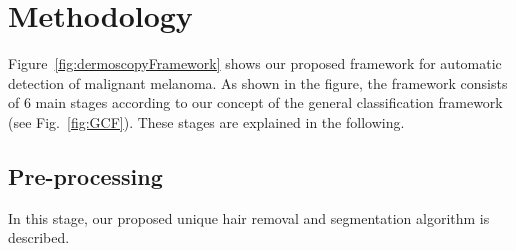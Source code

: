 \section{Methodology}
\label{sec:chp3-sec4}
Figure~\ref{fig:dermoscopyFramework} shows our proposed framework for automatic detection of malignant melanoma.
As shown in the figure, the framework consists of 6 main stages according to our concept of the general classification framework (see Fig.~\ref{fig:GCF}).
These stages are explained in the following.


\subsection{Pre-processing}
In this stage, our proposed unique hair removal and segmentation algorithm is described.










